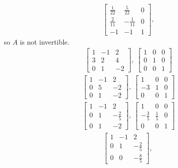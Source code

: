 \documentclass[12pt]{article}
\begin{document}
\begin{enumerate}
\begin{align*}
\begin{bmatrix}
        \frac{1}{22} & \frac{5}{22} & 0\\
        \frac{2}{11} & -\frac{1}{11} & 0\\
        -1 & -1 & 1
      \end{bmatrix},
    \end{align*}
    so $A$ is not invertible.
    \begin{align*}
      \begin{bmatrix}
        1 & -1 & 2\\
        3 & 2 & 4\\
        0 & 1 & -2
      \end{bmatrix},\
      \begin{bmatrix}
        1 & 0 & 0\\
        0 & 1 & 0\\
        0 & 0 & 1
      \end{bmatrix}
    \end{align*}
    \begin{align*}
      \begin{bmatrix}
        1 & -1 & 2\\
        0 & 5 & -2\\
        0 & 1 & -2
      \end{bmatrix},\
      \begin{bmatrix}
        1 & 0 & 0\\
        -3 & 1 & 0\\
        0 & 0 & 1
      \end{bmatrix}
    \end{align*}
    \begin{align*}
      \begin{bmatrix}
        1 & -1 & 2\\
        0 & 1 & -\frac{2}{5}\\
        0 & 1 & -2
      \end{bmatrix},\
      \begin{bmatrix}
        1 & 0 & 0\\
        -\frac{3}{5} & \frac{1}{5} & 0\\
        0 & 0 & 1
      \end{bmatrix}
    \end{align*}
    \begin{align*}
      \begin{bmatrix}
        1 & -1 & 2\\
        0 & 1 & -\frac{2}{5}\\
        0 & 0 & -\frac{8}{5}
      \end{bmatrix},\

\end{align*}
\end{enumerate}
\end{document}
